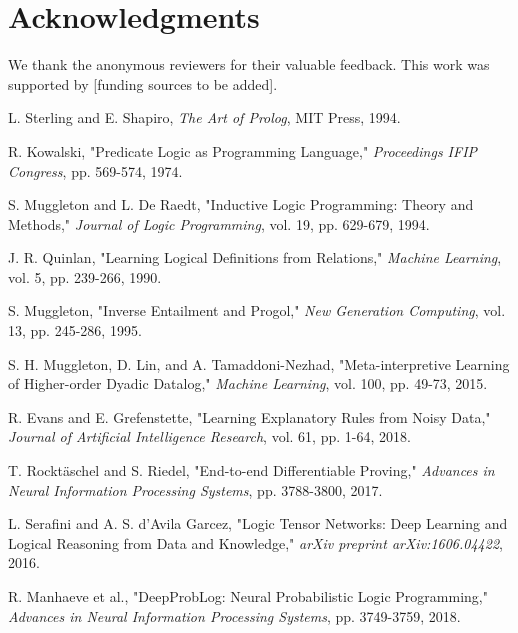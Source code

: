 \documentclass[10pt,conference]{IEEEtran}
\begin{document}
\section*{Acknowledgments}
We thank the anonymous reviewers for their valuable feedback. This work was supported by [funding sources to be added].

\begin{thebibliography}{99}

L. Sterling and E. Shapiro, \textit{The Art of Prolog}, MIT Press, 1994.

R. Kowalski, "Predicate Logic as Programming Language," \textit{Proceedings IFIP Congress}, pp. 569-574, 1974.

S. Muggleton and L. De Raedt, "Inductive Logic Programming: Theory and Methods," \textit{Journal of Logic Programming}, vol. 19, pp. 629-679, 1994.

J. R. Quinlan, "Learning Logical Definitions from Relations," \textit{Machine Learning}, vol. 5, pp. 239-266, 1990.

S. Muggleton, "Inverse Entailment and Progol," \textit{New Generation Computing}, vol. 13, pp. 245-286, 1995.

S. H. Muggleton, D. Lin, and A. Tamaddoni-Nezhad, "Meta-interpretive Learning of Higher-order Dyadic Datalog," \textit{Machine Learning}, vol. 100, pp. 49-73, 2015.

R. Evans and E. Grefenstette, "Learning Explanatory Rules from Noisy Data," \textit{Journal of Artificial Intelligence Research}, vol. 61, pp. 1-64, 2018.

T. Rocktäschel and S. Riedel, "End-to-end Differentiable Proving," \textit{Advances in Neural Information Processing Systems}, pp. 3788-3800, 2017.

L. Serafini and A. S. d'Avila Garcez, "Logic Tensor Networks: Deep Learning and Logical Reasoning from Data and Knowledge," \textit{arXiv preprint arXiv:1606.04422}, 2016.

R. Manhaeve et al., "DeepProbLog: Neural Probabilistic Logic Programming," \textit{Advances in Neural Information Processing Systems}, pp. 3749-3759, 2018.


\end{thebibliography}
\end{document}
